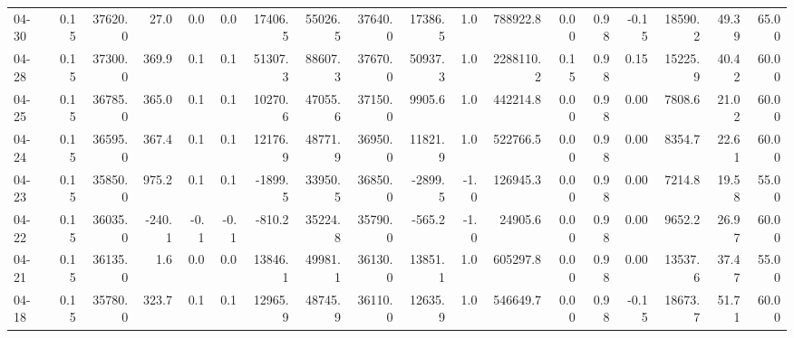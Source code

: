 \begin{threeparttable}
{\begin{tabular}{lrrrrrrrrrrrrrrrrr}
  04-30 &     0.15 & 37620.0 &              27.0 &               0.0 &                0.0 &            17406.5 & 55026.5 & 37640.0 &    17386.5 &                      1.0 &            788922.8 &       0.00 &      0.98 &          -0.15 &          18590.2 &           49.39 &                  65.00 \\
  04-28 &     0.15 & 37300.0 &             369.9 &               0.1 &                0.1 &            51307.3 & 88607.3 & 37670.0 &    50937.3 &                      1.0 &           2288110.2 &       0.15 &      0.98 &           0.15 &          15225.9 &           40.42 &                  60.00 \\
  04-25 &     0.15 & 36785.0 &             365.0 &               0.1 &                0.1 &            10270.6 & 47055.6 & 37150.0 &     9905.6 &                      1.0 &            442214.8 &       0.00 &      0.98 &           0.00 &           7808.6 &           21.02 &                  60.00 \\
  04-24 &     0.15 & 36595.0 &             367.4 &               0.1 &                0.1 &            12176.9 & 48771.9 & 36950.0 &    11821.9 &                      1.0 &            522766.5 &       0.00 &      0.98 &           0.00 &           8354.7 &           22.61 &                  60.00 \\
  04-23 &     0.15 & 35850.0 &             975.2 &               0.1 &                0.1 &            -1899.5 & 33950.5 & 36850.0 &    -2899.5 &                     -1.0 &            126945.3 &       0.00 &      0.98 &           0.00 &           7214.8 &           19.58 &                  55.00 \\
  04-22 &     0.15 & 36035.0 &            -240.1 &              -0.1 &               -0.1 &             -810.2 & 35224.8 & 35790.0 &     -565.2 &                     -1.0 &             24905.6 &       0.00 &      0.98 &           0.00 &           9652.2 &           26.97 &                  60.00 \\
  04-21 &     0.15 & 36135.0 &               1.6 &               0.0 &                0.0 &            13846.1 & 49981.1 & 36130.0 &    13851.1 &                      1.0 &            605297.8 &       0.00 &      0.98 &           0.00 &          13537.6 &           37.47 &                  55.00 \\
  04-18 &     0.15 & 35780.0 &             323.7 &               0.1 &                0.1 &            12965.9 & 48745.9 & 36110.0 &    12635.9 &                      1.0 &            546649.7 &       0.00 &      0.98 &          -0.15 &          18673.7 &           51.71 &                  60.00 \\

\end{tabular}}
\end{threeparttable}
